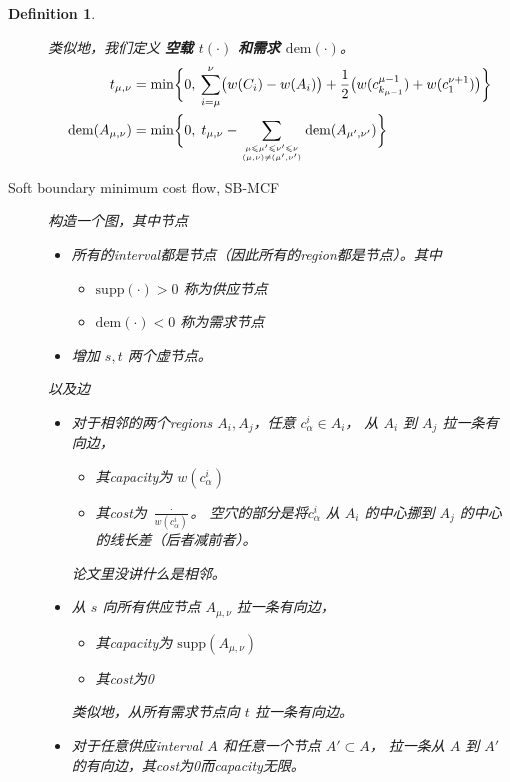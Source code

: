 \documentclass[UTF8,a4paper]{ctexart}
\renewcommand{\emph}[1]{\textbf{#1}}
\renewcommand{\leq}{\leqslant}
\newcommand{\supp}[1]{\text{supp} ({#1})}
\newcommand{\dem}[1]{\text{dem} ({#1})}
\renewcommand{\atop}[2]{\genfrac{}{}{0pt}{}{#1}{#2}}
\newtheorem{definition}{Definition}
\begin{document}
\begin{definition}
\begin{description}
        类似地，我们定义 \emph{空载 $t(\cdot)$ 和需求 $\dem{\cdot}$}。
        \begin{align*}
            t_{\mu,\nu} &=\min\biggl\{%
                0,\:%
                \sum_{i=\mu}^{\nu}\bigl(w(C_i)-w(A_i)\bigr)%
                +\frac{1}{2}\bigl(w(c^{\mu-1}_{k_{\mu-1}})+w(c^{\nu+1}_1)\bigr)
            \biggr\}
            \\
            \dem{A_{\mu,\nu}} &=\min\biggl\{%
                0,\;%
                t_{\mu,\nu}%
                -\sum_{\atop{\mu\leq\mu'\leq\nu'\leq\nu}{(\mu,\nu)\neq(\mu',\nu')}}\dem{A_{\mu',\nu'}}%
            \biggr\}
        \end{align*}
    \item[Soft boundary minimum cost flow, SB-MCF]
        构造一个图，其中节点
        \begin{itemize}
        \item 所有的interval都是节点（因此所有的region都是节点）。其中
            \begin{itemize}
            \item $\supp{\cdot}>0$ 称为供应节点
            \item $\dem{\cdot}<0$ 称为需求节点
            \end{itemize}
        \item 增加 $s,t$ 两个虚节点。
        \end{itemize}
        以及边
        \begin{itemize}
        \item 对于相邻的两个regions $A_i,A_j$，任意 $c^i_\alpha\in A_i$，
            从 $A_i$ 到 $A_j$ 拉一条有向边，
            \begin{itemize}
            \item 其capacity为 $w(c^i_\alpha)$
            \item 其cost为 $\frac{\cdot}{w(c^i_\alpha)}$。
                空穴的部分是将$c^i_\alpha$ 从 $A_i$ 的中心挪到 $A_j$ 的中心的线长差（后者减前者）。
            \end{itemize}
            \begin{noteblock}
                论文里没讲什么是相邻。
            \end{noteblock}
        \item 从 $s$ 向所有供应节点 $A_{\mu,\nu}$ 拉一条有向边，
            \begin{itemize}
            \item 其capacity为 $\supp{A_{\mu,\nu}}$
            \item 其cost为0
            \end{itemize}
            类似地，从所有需求节点向 $t$ 拉一条有向边。
        \item 对于任意供应interval $A$ 和任意一个节点 $A'\subset A$，
            拉一条从 $A$ 到 $A'$ 的有向边，其cost为0而capacity无限。


\end{itemize}
\end{description}
\end{definition}
\end{document}
